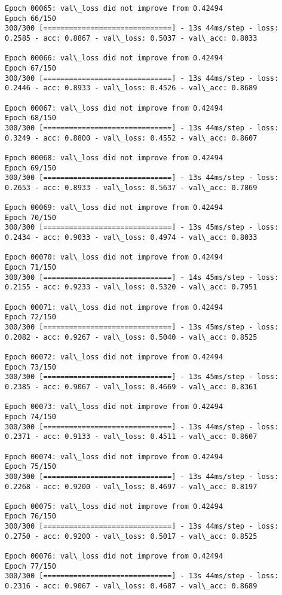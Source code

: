 \documentclass[11pt]{article}
\begin{document}
\begin{Verbatim}[commandchars=\\\{\}]
Epoch 00065: val\_loss did not improve from 0.42494
Epoch 66/150
300/300 [==============================] - 13s 44ms/step - loss: 0.2585 - acc: 0.8867 - val\_loss: 0.5037 - val\_acc: 0.8033

Epoch 00066: val\_loss did not improve from 0.42494
Epoch 67/150
300/300 [==============================] - 13s 44ms/step - loss: 0.2446 - acc: 0.8933 - val\_loss: 0.4526 - val\_acc: 0.8689

Epoch 00067: val\_loss did not improve from 0.42494
Epoch 68/150
300/300 [==============================] - 13s 44ms/step - loss: 0.3249 - acc: 0.8800 - val\_loss: 0.4552 - val\_acc: 0.8607

Epoch 00068: val\_loss did not improve from 0.42494
Epoch 69/150
300/300 [==============================] - 13s 44ms/step - loss: 0.2653 - acc: 0.8933 - val\_loss: 0.5637 - val\_acc: 0.7869

Epoch 00069: val\_loss did not improve from 0.42494
Epoch 70/150
300/300 [==============================] - 13s 45ms/step - loss: 0.2434 - acc: 0.9033 - val\_loss: 0.4974 - val\_acc: 0.8033

Epoch 00070: val\_loss did not improve from 0.42494
Epoch 71/150
300/300 [==============================] - 14s 45ms/step - loss: 0.2155 - acc: 0.9233 - val\_loss: 0.5320 - val\_acc: 0.7951

Epoch 00071: val\_loss did not improve from 0.42494
Epoch 72/150
300/300 [==============================] - 13s 45ms/step - loss: 0.2082 - acc: 0.9267 - val\_loss: 0.5040 - val\_acc: 0.8525

Epoch 00072: val\_loss did not improve from 0.42494
Epoch 73/150
300/300 [==============================] - 13s 45ms/step - loss: 0.2385 - acc: 0.9067 - val\_loss: 0.4669 - val\_acc: 0.8361

Epoch 00073: val\_loss did not improve from 0.42494
Epoch 74/150
300/300 [==============================] - 13s 44ms/step - loss: 0.2371 - acc: 0.9133 - val\_loss: 0.4511 - val\_acc: 0.8607

Epoch 00074: val\_loss did not improve from 0.42494
Epoch 75/150
300/300 [==============================] - 13s 44ms/step - loss: 0.2268 - acc: 0.9200 - val\_loss: 0.4697 - val\_acc: 0.8197

Epoch 00075: val\_loss did not improve from 0.42494
Epoch 76/150
300/300 [==============================] - 13s 44ms/step - loss: 0.2750 - acc: 0.9200 - val\_loss: 0.5017 - val\_acc: 0.8525

Epoch 00076: val\_loss did not improve from 0.42494
Epoch 77/150
300/300 [==============================] - 13s 44ms/step - loss: 0.2316 - acc: 0.9067 - val\_loss: 0.4687 - val\_acc: 0.8689


\end{Verbatim}
\end{document}

